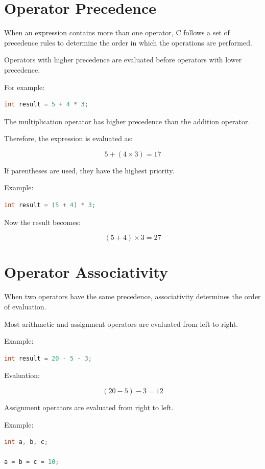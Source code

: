 \documentclass[12pt,openany]{book}
\begin{document}
\section{Operator Precedence}

When an expression contains more than one operator, C follows a set of precedence rules to determine the order in which the operations are performed.

Operators with higher precedence are evaluated before operators with lower precedence.

For example:

\begin{lstlisting}[language=C]
int result = 5 + 4 * 3;
\end{lstlisting}

The multiplication operator has higher precedence than the addition operator.

Therefore, the expression is evaluated as:

\[
5 + (4 \times 3) = 17
\]

If parentheses are used, they have the highest priority.

Example:

\begin{lstlisting}[language=C]
int result = (5 + 4) * 3;
\end{lstlisting}

Now the result becomes:

\[
(5 + 4) \times 3 = 27
\]

\section{Operator Associativity}

When two operators have the same precedence, associativity determines the order of evaluation.

Most arithmetic and assignment operators are evaluated from left to right.

Example:

\begin{lstlisting}[language=C]
int result = 20 - 5 - 3;
\end{lstlisting}

Evaluation:

\[
(20 - 5) - 3 = 12
\]

Assignment operators are evaluated from right to left.

Example:

\begin{lstlisting}[language=C]
int a, b, c;

a = b = c = 10;
\end{lstlisting}
\end{document}
